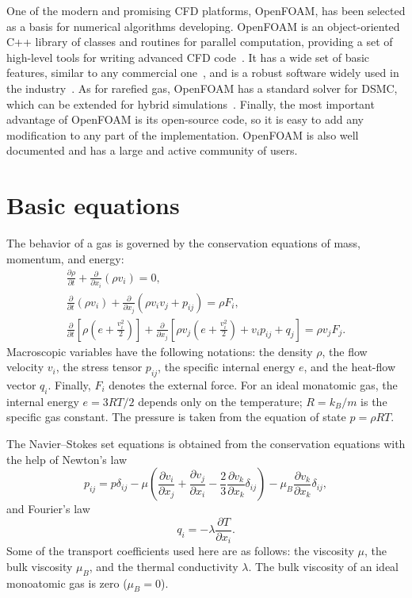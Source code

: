 \documentclass[smallextended, final]{svjour3} %
\newcommand{\pder}[2][]{\frac{\partial#1}{\partial#2}}
\begin{document}
One of the modern and promising CFD platforms, OpenFOAM\textregistered{},
has been selected as a basis for numerical algorithms developing.
OpenFOAM\textregistered{} is an object-oriented C++ library of classes and routines for parallel computation,
providing a set of high-level tools for writing advanced CFD code~\cite{OpenFOAM1998}.
It has a wide set of basic features, similar to any commercial one~\cite{OpenFOAM2010},
and is a robust software widely used in the industry~\cite{BoilingFlows2009,
TurbulentCombustion2011, CoastalEngineering2013, BiomassPyrolysis2013}.
As for rarefied gas, OpenFOAM\textregistered{} has a standard solver for DSMC, which
can be extended for hybrid simulations~\cite{HybridSolver2014}.
Finally, the most important advantage of OpenFOAM\textregistered{} is its open-source code,
so it is easy to add any modification to any part of the implementation.
OpenFOAM\textregistered{} is also well documented and has a large and active community of users.

\section{Basic equations}

The behavior of a gas is governed by the conservation equations of mass, momentum, and energy:
\begin{gather}
    \pder[\rho]{t} + \pder{x_i}(\rho v_i) = 0, \label{eq:mass}\\
    \pder{t}(\rho v_i) + \pder{x_j}(\rho v_i v_j + p_{ij}) = \rho F_i, \label{eq:momentum}\\
    \pder{t}\left[\rho\left(e+\frac{v_i^2}2\right)\right] +
        \pder{x_j}\left[\rho v_j\left(e+\frac{v_i^2}2\right)+v_i p_{ij}+q_j\right] = \rho v_j F_j. \label{eq:energy}
\end{gather}
Macroscopic variables have the following notations: the density \(\rho\), the flow velocity \(v_i\),
the stress tensor \(p_{ij}\), the specific internal energy \(e\), and the heat-flow vector \(q_i\).
Finally, \(F_i\) denotes the external force.
For an ideal monatomic gas, the internal energy \(e = 3RT/2\) depends only on the temperature;
\(R = k_B / m\) is the specific gas constant.
The pressure is taken from the equation of state \( p = \rho RT \).

The Navier--Stokes set equations is obtained from the conservation equations with the help of Newton's law
\begin{equation}\label{eq:Newton_law}
    p_{ij} = p\delta_{ij} - \mu\left(\pder[v_i]{x_j}+\pder[v_j]{x_i}-\frac23\pder[v_k]{x_k}\delta_{ij}\right) -
        \mu_B\pder[v_k]{x_k}\delta_{ij},
\end{equation}
and Fourier's law
\begin{equation}\label{eq:Fourier_law}
    q_i = -\lambda\pder[T]{x_i}.
\end{equation}
Some of the transport coefficients used here are as follows:
the viscosity \(\mu\), the bulk viscosity \(\mu_B\), and the thermal conductivity \(\lambda\).
The bulk viscosity of an ideal monoatomic gas is zero (\(\mu_B = 0\)).
\end{document}
